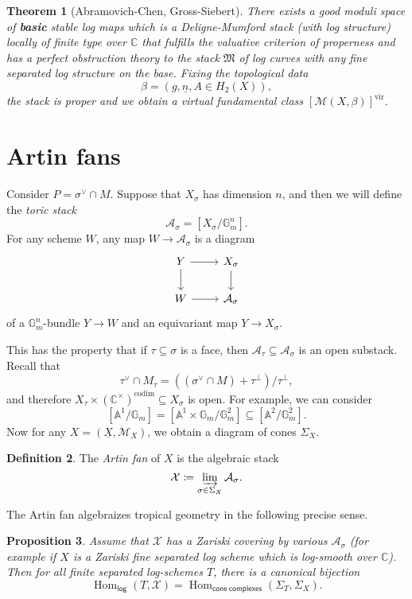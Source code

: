 \documentclass[leqno, openany]{memoir}
\newtheorem{thm}{Theorem}[section]
\newtheorem{prop}[thm]{Proposition}
\theoremstyle{definition}
\newtheorem{defn}[thm]{Definition}
\theoremstyle{remark}
\theoremstyle{plain}
\theoremstyle{definition}
\theoremstyle{remark}
\newcommand{\A}{\mathbb{A}}
\newcommand{\G}{\mathbb{G}}
\newcommand{\C}{\mathbb{C}}
\newcommand{\mc}[1]{\mathcal{#1}}
\newcommand{\mf}[1]{\mathfrak{#1}}
\newcommand{\mr}[1]{\mathrm{#1}}
\newcommand{\ms}[1]{\mathsf{#1}}
\newcommand{\ul}[1]{\underline{#1}}
\DeclareMathOperator{\Hom}{Hom}
\DeclareMathOperator{\codim}{codim}
\begin{document}
\begin{thm}[Abramovich-Chen, Gross-Siebert]
  There exists a good moduli space of \textbf{basic} stable log maps which is a Deligne-Mumford stack (with log structure) locally of finite type over $\C$ that fulfills the valuative criterion of properness and has a perfect obstruction theory to the stack $\mf{M}$ of log curves with any fine separated log structure on the base. Fixing the topological data
  \[ \beta = (g, \ul{n}, A \in H_2(X)), \]
  the stack is proper and we obtain a virtual fundamental class $[\mc{M}(X, \beta)]^{\mr{vir}}$.
\end{thm}

\section{Artin fans}
\label{sec:artin_fans}

Consider $P = \sigma^{\vee} \cap M$. Suppose that $X_{\sigma}$ has dimension $n$, and then we will define the \textit{toric stack}
\[ \mc{A}_{\sigma} = [X_{\sigma} / \G_m^n]. \]
For any scheme $W$, any map $W \to \mc{A}_{\sigma}$ is a diagram
\begin{equation*}
  \begin{tikzcd}
    Y \ar{r} \ar{d} & X_{\sigma} \ar{d} \\
    W \ar{r} & \mc{A}_{\sigma}
  \end{tikzcd}
\end{equation*}
of a $\G_m^n$-bundle $Y \to W$ and an equivariant map $Y \to X_{\sigma}$.

This has the property that if $\tau \subseteq \sigma$ is a face, then $\mc{A}_{\tau} \subseteq \mc{A}_{\sigma}$ is an open substack. Recall that
\[ \tau^{\vee} \cap M_{\tau} = ((\sigma^{\vee} \cap M) + \tau^{\perp}) / \tau^{\perp}, \]
and therefore $X_{\tau} \times (\C^{\times})^{\codim} \subseteq X_{\sigma}$ is open. For example, we can consider
\[ [\A^1/\G_m] = [\A^1 \times \G_m / \G_m^2] \subseteq [\A^2 / \G_m^2]. \]
Now for any $X = (\ul{X}, \mc{M}_X)$, we obtain a diagram of cones $\Sigma_X$.

\begin{defn}
  The \textit{Artin fan} of $X$ is the algebraic stack
  \[ \mc{X} \coloneqq \varinjlim_{\sigma \in \Sigma_X} \mc{A}_{\sigma}. \]
\end{defn}

The Artin fan algebraizes tropical geometry in the following precise sense.

\begin{prop}
  Assume that $\mc{X}$ has a Zariski covering by various $\mc{A}_{\sigma}$ (for example if $X$ is a Zariski fine separated log scheme which is log-smooth over $\C$). Then for all finite separated log-schemes $T$, there is a canonical bijection
  \[ \Hom_{\ms{log}}(T, \mc{X}) = \Hom_{\ms{cone\ complexes}}(\Sigma_T, \Sigma_X). \]
\end{prop}
\end{document}

